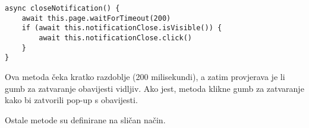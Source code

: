 \begin{verbatim}
async closeNotification() {
    await this.page.waitForTimeout(200)
    if (await this.notificationClose.isVisible()) {
        await this.notificationClose.click()
    }
}
\end{verbatim}
Ova metoda čeka kratko razdoblje (200 milisekundi), a zatim provjerava je li gumb za zatvaranje obavijesti vidljiv. Ako jest, metoda klikne gumb za zatvaranje kako bi zatvorili pop-up s obavijesti.

Ostale metode su definirane na sličan način.